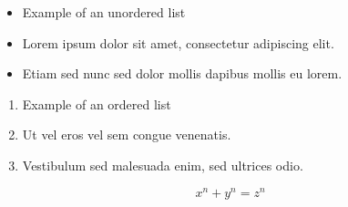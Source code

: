
    
\begin{itemize}
    \item Example of an unordered list
    \item Lorem ipsum dolor sit amet, consectetur adipiscing elit.
    \item Etiam sed nunc sed dolor mollis dapibus mollis eu lorem.
\end{itemize}

\begin{enumerate}
    \item Example of an ordered list
    \item Ut vel eros vel sem congue venenatis.
    \item Vestibulum sed malesuada enim, sed ultrices odio.
\end{enumerate}

\[ x^n + y^n = z^n \]
